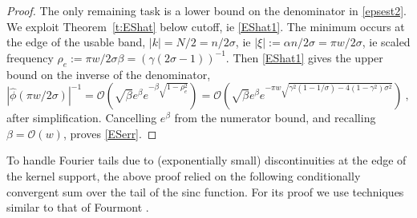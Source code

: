 \documentclass[10pt]{article}
\newcommand{\bigO}{{\mathcal O}}
\newcommand{\freq}{\beta}          %
\newcommand{\rat}{\sigma}          %
\newcommand{\al}{\alpha}           %
\begin{document}
\begin{proof}
   The only remaining task is a
   lower bound on the denominator in \eqref{epsest2}.
   We exploit Theorem~\ref{t:EShat} below cutoff, ie \eqref{EShat1}.
   The minimum occurs at the edge of the usable band, $|k|=N/2 = n/2\rat$,
   ie $|\xi| := \al n/2\rat = \pi w/2\rat$,
   ie scaled frequency $\rho_e := \pi w/2\rat\freq = (\gamma(2\rat-1))^{-1}$.
   Then \eqref{EShat1} gives the upper bound on the inverse of the denominator,
   $$
   |\hat\phi(\pi w/2\rat)|^{-1} =
   \bigO(\sqrt{\freq} e^\freq e^{-\freq\sqrt{1-\rho_e^2}})
   =
   \bigO(\sqrt{\freq} e^\freq e^{-\pi w \sqrt{\gamma^2(1-1/\rat) - 4(1-\gamma^2)\rat^2}})
   ~,
   $$
   after simplification.
   Cancelling $e^\freq$ from the numerator bound,
   and recalling $\freq = \bigO(w)$,
   proves \eqref{ESerr}.
  \end{proof}


To handle Fourier tails due to (exponentially small) discontinuities
at the edge of the kernel support, the above proof relied on the following
conditionally convergent sum over the tail of the sinc function. For
its proof we use techniques similar to that of Fourmont
\cite[Lemma~2.5.4]{fourmontthesis}.
\end{document}

